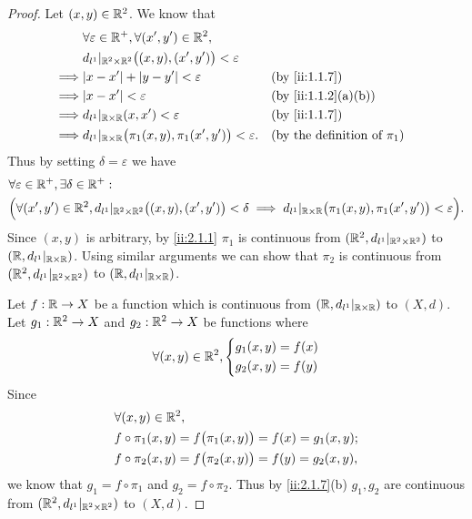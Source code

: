 \begin{proof}
  Let \((x, y) \in \mathbb{R}^2\).
  We know that
  \begin{align*}
             & \forall \varepsilon \in \R^+, \forall (x', y') \in \R^2,                                                                \\
             & d_{l^1}|_{\R^2 \times \R^2}\big((x, y), (x', y')\big) < \varepsilon                                                     \\
    \implies & \abs{x - x'} + \abs{y - y'} < \varepsilon                                  &  & \by{ii:1.1.7}                              \\
    \implies & \abs{x - x'} < \varepsilon                                                 &  & \by{ii:1.1.2}[a,b]                         \\
    \implies & d_{l^1}|_{\R \times \R}(x, x') < \varepsilon                               &  & \by{ii:1.1.7}                              \\
    \implies & d_{l^1}|_{\R \times \R}\big(\pi_1(x, y), \pi_1(x', y')\big) < \varepsilon. &  & \text{(by the definition of \(\pi_1\))}
  \end{align*}
  Thus by setting \(\delta = \varepsilon\) we have
  \begin{align*}
     & \forall \varepsilon \in \mathbb{R}^+, \exists \delta \in \mathbb{R}^+ :                                                                                                                                 \\
     & \Big(\forall (x', y') \in \mathbb{R}^2, d_{l^1}|_{\mathbb{R}^2 \times \mathbb{R}^2}\big((x, y), (x', y')\big) < \delta \implies d_{l^1}|_{\mathbb{R} \times \mathbb{R}}\big(\pi_1(x, y), \pi_1(x', y')\big) < \varepsilon\Big).
  \end{align*}
  Since \((x, y)\) is arbitrary, by \cref{ii:2.1.1} \(\pi_1\) is continuous from \((\mathbb{R}^2, d_{l^1}|_{\mathbb{R}^2 \times \mathbb{R}^2})\) to \((\mathbb{R}, d_{l^1}|_{\mathbb{R} \times \mathbb{R}})\).
  Using similar arguments we can show that \(\pi_2\) is continuous from \((\mathbb{R}^2, d_{l^1}|_{\mathbb{R}^2 \times \mathbb{R}^2})\) to \((\mathbb{R}, d_{l^1}|_{\mathbb{R} \times \mathbb{R}})\).

  Let \(f : \mathbb{R} \to X\) be a function which is continuous from \((\mathbb{R}, d_{l^1}|_{\mathbb{R} \times \mathbb{R}})\) to \((X, d)\).
  Let \(g_1 : \mathbb{R}^2 \to X\) and \(g_2 : \mathbb{R}^2 \to X\) be functions where
  \[
    \forall (x, y) \in \mathbb{R}^2, \begin{dcases}
      g_1(x, y) = f(x) \\
      g_2(x, y) = f(y)
    \end{dcases}
  \]
  Since
  \begin{align*}
     & \forall (x, y) \in \mathbb{R}^2,                                         \\
     & f \circ \pi_1(x, y) = f\big(\pi_1(x, y)\big) = f(x) = g_1(x, y); \\
     & f \circ \pi_2(x, y) = f\big(\pi_2(x, y)\big) = f(y) = g_2(x, y),
  \end{align*}
  we know that \(g_1 = f \circ \pi_1\) and \(g_2 = f \circ \pi_2\).
  Thus by \cref{ii:2.1.7}(b) \(g_1, g_2\) are continuous from \((\mathbb{R}^2, d_{l^1}|_{\mathbb{R}^2 \times \mathbb{R}^2})\) to \((X, d)\).
\end{proof}

